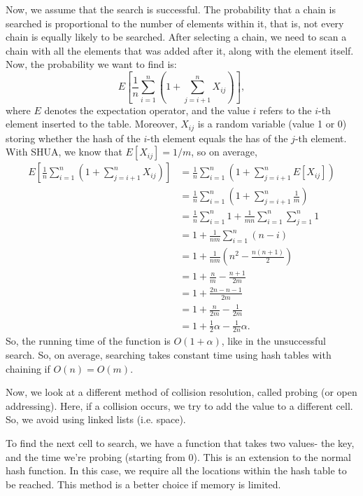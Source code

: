 \documentclass[a4paper, openany]{memoir}
\begin{document}
\noindent Now, we assume that the search is successful. The probability that a chain is searched is proportional to the number of elements within it, that is, not every chain is equally likely to be searched. After selecting a chain, we need to scan a chain with all the elements that was added after it, along with the element itself. Now, the probability we want to find is:
\[E\left[\frac{1}{n} \sum_{i=1}^{n} \left(1 + \sum_{j=i+1}^{n} X_{ij} \right)\right],\]
where $E$ denotes the expectation operator, and the value $i$ refers to the $i$-th element inserted to the table. Moreover, $X_{ij}$ is a random variable (value 1 or 0) storing whether the hash of the $i$-th element equals the has of the $j$-th element. With SHUA, we know that $E[X_{ij}] = 1/m$, so on average, 
\begin{align*}
    E\left[\frac{1}{n} \sum_{i=1}^{n} \left(1 + \sum_{j=i+1}^{n} X_{ij} \right)\right] &= \frac{1}{n} \sum_{i=1}^{n} \left(1 + \sum_{j=i+1}^{n} E[X_{ij}] \right) \\
    &= \frac{1}{n} \sum_{i=1}^{n} \left(1 + \sum_{j=i+1}^{n} \frac{1}{m} \right) \\
    &= \frac{1}{n} \sum_{i=1}^n 1 + \frac{1}{mn} \sum_{i=1}^n \sum_{j=1}^n 1 \\
    &= 1 + \frac{1}{nm} \sum_{i=1}^n (n-i) \\
    &= 1 + \frac{1}{nm} \left(n^2 - \frac{n(n+1)}{2}\right) \\
    &= 1 + \frac{n}{m} - \frac{n+1}{2m} \\
    &= 1 + \frac{2n-n-1}{2m} \\
    &= 1 + \frac{n}{2m} - \frac{1}{2m} \\
    &= 1 + \frac{1}{2} \alpha - \frac{1}{2n} \alpha.
\end{align*}
So, the running time of the function is $O(1 + \alpha)$, like in the unsuccessful search. So, on average, searching takes constant time using hash tables with chaining if $O(n) = O(m)$.

Now, we look at a different method of collision resolution, called probing (or open addressing). Here, if a collision occurs, we try to add the value to a different cell. So, we avoid using linked lists (i.e. space). 

\noindent To find the next cell to search, we have a function that takes two values- the key, and the time we're probing (starting from 0). This is an extension to the normal hash function. In this case, we require all the locations within the hash table to be reached. This method is a better choice if memory is limited.
\end{document}
